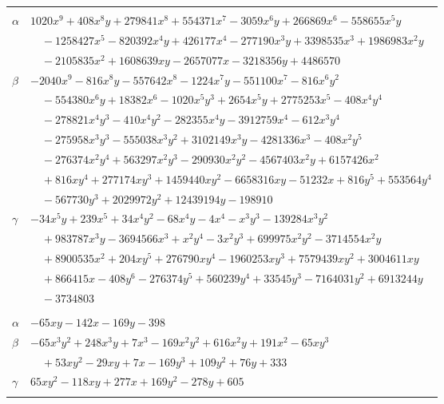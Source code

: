 \documentclass[11pt]{article}
\begin{document}
\begin{longtable}{@{}ll@{}}
\addlinespace[3pt]
\multicolumn{2}{@{}l}{$\{i,j\}=\{26,166\}$, $k_{ij}=2^{11}\cdot 5^{2}\cdot 7\cdot 37$}\\
$\alpha$ & $1020x^{9}+408x^{8}y+279841x^{8}+554371x^{7}-3059x^{6}y+266869x^{6}-558655x^{5}y$\\
 & $\quad -1258427x^{5}-820392x^{4}y+426177x^{4}-277190x^{3}y+3398535x^{3}+1986983x^{2}y$\\
 & $\quad -2105835x^{2}+1608639xy-2657077x-3218356y+4486570$\\
$\beta$ & $-2040x^{9}-816x^{8}y-557642x^{8}-1224x^{7}y-551100x^{7}-816x^{6}y^{2}$\\
 & $\quad -554380x^{6}y+18382x^{6}-1020x^{5}y^{3}+2654x^{5}y+2775253x^{5}-408x^{4}y^{4}$\\
 & $\quad -278821x^{4}y^{3}-410x^{4}y^{2}-282355x^{4}y-3912759x^{4}-612x^{3}y^{4}$\\
 & $\quad -275958x^{3}y^{3}-555038x^{3}y^{2}+3102149x^{3}y-4281336x^{3}-408x^{2}y^{5}$\\
 & $\quad -276374x^{2}y^{4}+563297x^{2}y^{3}-290930x^{2}y^{2}-4567403x^{2}y+6157426x^{2}$\\
 & $\quad +816xy^{4}+277174xy^{3}+1459440xy^{2}-6658316xy-51232x+816y^{5}+553564y^{4}$\\
 & $\quad -567730y^{3}+2029972y^{2}+12439194y-198910$\\
$\gamma$ & $-34x^{5}y+239x^{5}+34x^{4}y^{2}-68x^{4}y-4x^{4}-x^{3}y^{3}-139284x^{3}y^{2}$\\
 & $\quad +983787x^{3}y-3694566x^{3}+x^{2}y^{4}-3x^{2}y^{3}+699975x^{2}y^{2}-3714554x^{2}y$\\
 & $\quad +8900535x^{2}+204xy^{5}+276790xy^{4}-1960253xy^{3}+7579439xy^{2}+3004611xy$\\
 & $\quad +866415x-408y^{6}-276374y^{5}+560239y^{4}+33545y^{3}-7164031y^{2}+6913244y$\\
 & $\quad -3734803$\\
\addlinespace[3pt]
\multicolumn{2}{@{}l}{$\{i,j\}=\{27,32\}$, $k_{ij}=2^{5}\cdot 3^{2}$}\\
$\alpha$ & $-65xy-142x-169y-398$\\
$\beta$ & $-65x^{3}y^{2}+248x^{3}y+7x^{3}-169x^{2}y^{2}+616x^{2}y+191x^{2}-65xy^{3}$\\
 & $\quad +53xy^{2}-29xy+7x-169y^{3}+109y^{2}+76y+333$\\
$\gamma$ & $65xy^{2}-118xy+277x+169y^{2}-278y+605$\\
\addlinespace[3pt]
\multicolumn{2}{@{}l}{$\{i,j\}=\{28,29\}$, $k_{ij}=7^{3}$}\\

\end{longtable}
\end{document}
